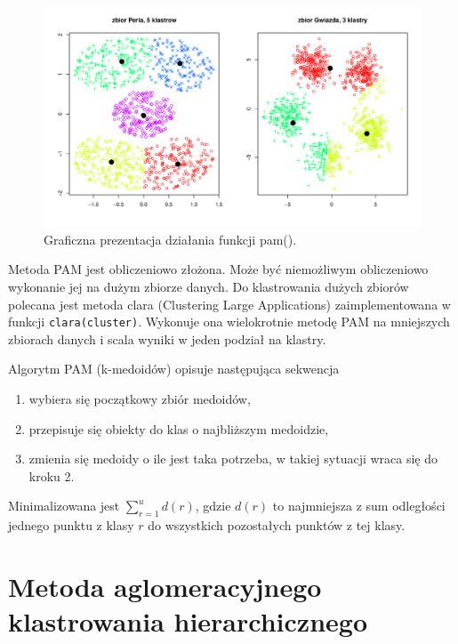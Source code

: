 \documentclass[polish,]{book}
\begin{document}
\begin{figure}[h]

{\centering \includegraphics[width=1\linewidth]{pam} 

}

\caption{Graficzna prezentacja działania funkcji pam().}\label{fig:pam}
\end{figure}

Metoda PAM jest obliczeniowo złożona. Może być niemożliwym obliczeniowo
wykonanie jej na dużym zbiorze danych. Do klastrowania dużych zbiorów polecana jest metoda clara (Clustering Large Applications) zaimplementowana w funkcji
\texttt{clara(cluster)}. Wykonuje ona wielokrotnie metodę PAM na mniejszych zbiorach
danych i scala wyniki w jeden podział na klastry.

Algorytm PAM (k-medoidów) opisuje następująca sekwencja

\begin{enumerate}
\def\labelenumi{\arabic{enumi}.}
\item
  wybiera się początkowy zbiór medoidów,
\item
  przepisuje się obiekty do klas o najbliższym medoidzie,
\item
  zmienia się medoidy o ile jest taka potrzeba, w takiej sytuacji wraca się do
  kroku 2.
\end{enumerate}

Minimalizowana jest \(\sum_{r=1}^{u}d(r)\), gdzie \(d(r)\) to najmniejsza z sum odległości jednego punktu z klasy \(r\) do wszystkich pozostałych punktów z tej klasy.

\hypertarget{part_33}{%
\section{Metoda aglomeracyjnego klastrowania hierarchicznego}\label{part_33}}
\end{document}

